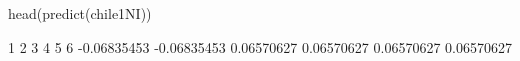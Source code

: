 \begin{Schunk}
\begin{Sinput}
 head(predict(chile1NI))
\end{Sinput}
\begin{Soutput}
          1           2           3           4           5           6 
-0.06835453 -0.06835453  0.06570627  0.06570627  0.06570627  0.06570627 
\end{Soutput}
\end{Schunk}
